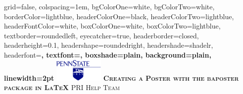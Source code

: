 \documentclass[landscape,final,a0paper,fontscale=0.285]{baposter}
\begin{document}



\begin{poster}%
  {
  grid=false,
  colspacing=1em,
  bgColorOne=white,
  bgColorTwo=white,
  borderColor=lightblue,
  headerColorOne=black,
  headerColorTwo=lightblue,
  headerFontColor=white,
  boxColorOne=white,
  boxColorTwo=lightblue,
  textborder=roundedleft,
  eyecatcher=true,
  headerborder=closed,
  headerheight=0.1\textheight,
  headershape=roundedright,
  headershade=shadelr,
  headerfont=\Large\bf\textsc, %
  textfont={\setlength{\parindent}{1.5em}},
  boxshade=plain,
  background=plain,
  linewidth=2pt
  }
  {\includegraphics[height=3em]{images/psulogo.png}} 
  {\bf\textsc{Creating a Poster with the baposter package in \LaTeX{} } \vspace{0.5em}}
  {\textsc{PRI Help Team}}
  {%
  }

    \newcommand{\colouredcircle}{%
      \tikz{\useasboundingbox (-0.2em,-0.32em) rectangle(0.2em,0.32em); \draw[draw=black,fill=lightblue,line width=0.03em] (0,0) circle(0.18em);}}



\end{poster}
\end{document}
